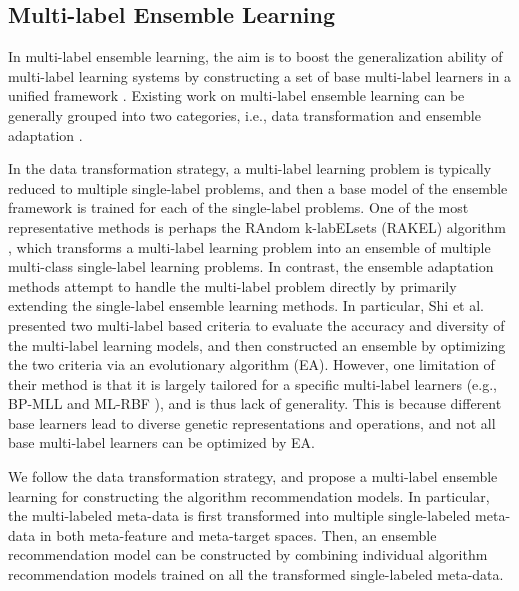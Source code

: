 \documentclass[prodmode,acmtkdd]{acmsmall}
\begin{document}



\subsection{Multi-label Ensemble Learning}


In multi-label ensemble learning, the aim is to boost the generalization ability of multi-label learning systems 
by constructing a set of base multi-label learners in a unified framework \cite{tsoumakas2007random,Gulisong2010triple,Lior2014ensemble,shi2011multi,min2014Review}.
Existing work on multi-label ensemble learning can be generally grouped into two categories, i.e., data
transformation \cite{tsoumakas2007random,Gulisong2010triple,Lior2014ensemble} and ensemble adaptation \cite{shi2011multi}. 



In the data transformation strategy, 
a multi-label learning problem is typically reduced to multiple single-label problems, 
and then a base model of the ensemble framework is trained for each of the single-label problems. 
One of the most representative methods is perhaps the RAndom k-labELsets (RAKEL) algorithm \cite{tsoumakas2007random}, 
which transforms a multi-label learning problem into an ensemble of multiple multi-class single-label learning problems. 
In contrast, 
the ensemble adaptation methods attempt to handle the multi-label problem directly
by primarily extending the single-label ensemble learning methods. 
In particular,
Shi et al. \cite{shi2011multi} presented two multi-label based criteria to evaluate the accuracy and
diversity of the multi-label learning models, 
and then constructed an ensemble by optimizing the two criteria via an evolutionary algorithm (EA). 
However, one limitation of their method is that 
it is largely tailored for a specific multi-label learners (e.g., BP-MLL \cite{zhang2006multi} and ML-RBF
\cite{zhang2009ml}), and is thus lack of generality.
This is because different base learners lead to diverse genetic representations and operations, 
and not all base multi-label learners can be optimized by EA.




We follow the data transformation strategy, 
and propose a multi-label ensemble learning for constructing the algorithm recommendation models.
In particular, 
the multi-labeled meta-data is first transformed into multiple single-labeled meta-data in
both meta-feature and meta-target spaces.
Then, an ensemble recommendation model can be constructed
by combining individual algorithm recommendation models trained on all the transformed single-labeled meta-data.
\end{document}
